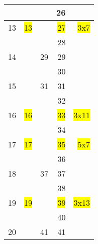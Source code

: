 \begin{tabular}{|r|r|r|r|r|}
\hline                              &                        &         &     26    &                                \\
\hline               13             &   \colorbox{yellow}{13}&         &     \colorbox{yellow}{27}    &     \colorbox{yellow}{3x7  }   \\
\hline                              &                        &         &     28    &                                \\
\hline               14             &                        &    29   &     29    &                                \\
\hline                              &                        &         &     30    &                                \\
\hline               15             &                        &    31   &     31    &                                \\
\hline                              &                        &         &     32    &                                \\
\hline               16             &   \colorbox{yellow}{16}&         &     \colorbox{yellow}{33}    &     \colorbox{yellow}{3x11  }  \\
\hline                              &                        &         &     34    &                                \\
\hline               17             &   \colorbox{yellow}{17}&         &     \colorbox{yellow}{35}    &     \colorbox{yellow}{5x7  }   \\
\hline                              &                        &         &     36    &                                \\
\hline               18             &                        &     37  &     37    &                                \\
\hline                              &                        &         &     38    &                                \\
\hline               19             &   \colorbox{yellow}{19}&         &     \colorbox{yellow}{39}    &     \colorbox{yellow}{3x13  }  \\
\hline                              &                        &         &     40    &                                \\
\hline               20             &                        &     41  &     41    &                                \\

\end{tabular}

